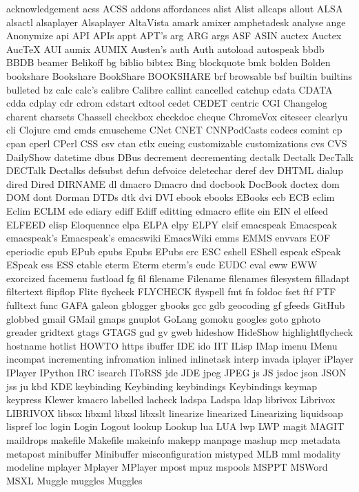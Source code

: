 acknowledgement
acss
ACSS
addons
affordances
alist
Alist
allcaps
allout
ALSA
alsactl
alsaplayer
Alsaplayer
AltaVista
amark
amixer
amphetadesk
analyse
ange
Anonymize
api
API
APIs
appt
APT's
arg
ARG
args
ASF
ASIN
auctex
Auctex
AucTeX
AUI
aumix
AUMIX
Austen's
auth
Auth
autoload
autospeak
bbdb
BBDB
beamer
Belikoff
bg
biblio
bibtex
Bing
blockquote
bmk
bolden
Bolden
bookshare
Bookshare
BookShare
BOOKSHARE
brf
browsable
bsf
builtin
builtins
bulleted
bz
calc
calc's
calibre
Calibre
callint
cancelled
catchup
cdata
CDATA
cdda
cdplay
cdr
cdrom
cdstart
cdtool
cedet
CEDET
centric
CGI
Changelog
charent
charsets
Chassell
checkbox
checkdoc
cheque
ChromeVox
citeseer
clearlyu
cli
Clojure
cmd
cmds
cmuscheme
CNet
CNET
CNNPodCasts
codecs
comint
cp
cpan
cperl
CPerl
CSS
csv
ctan
ctlx
cueing
customizable
customizations
cvs
CVS
DailyShow
datetime
dbus
DBus
decrement
decrementing
dectalk
Dectalk
DecTalk
DECTalk
Dectalks
defsubst
defun
defvoice
deletechar
deref
dev
DHTML
dialup
dired
Dired
DIRNAME
dl
dmacro
Dmacro
dnd
docbook
DocBook
doctex
dom
DOM
dont
Dorman
DTDs
dtk
dvi
DVI
ebook
ebooks
EBooks
ecb
ECB
eclim
Eclim
ECLIM
ede
ediary
ediff
Ediff
editting
edmacro
eflite
ein
EIN
el
elfeed
ELFEED
elisp
Eloquennce
elpa
ELPA
elpy
ELPY
elsif
emacspeak
Emacspeak
emacspeak's
Emacspeak's
emacswiki
EmacsWiki
emms
EMMS
envvars
EOF
eperiodic
epub
EPub
epubs
Epubs
EPubs
erc
ESC
eshell
EShell
espeak
eSpeak
ESpeak
ess
ESS
etable
eterm
Eterm
eterm's
eudc
EUDC
eval
eww
EWW
exorcized
facemenu
fastload
fg
fil
filename
Filename
filenames
filesystem
filladapt
filtertext
flipflop
Flite
flycheck
FLYCHECK
flyspell
fmt
fn
foldoc
fset
ftf
FTF
fulltext
func
GAFA
galeon
gblogger
gbooks
gcc
gdb
geocoding
gf
gfeeds
GitHub
globbed
gmail
GMail
gmaps
gnuplot
GoLang
gomoku
googles
goto
gphoto
greader
gridtext
gtags
GTAGS
gud
gv
gweb
hideshow
HideShow
highlightflycheck
hostname
hotlist
HOWTO
https
ibuffer
IDE
ido
IIT
ILisp
IMap
imenu
IMenu
incompat
incrementing
infromation
inlined
inlinetask
interp
invada
iplayer
iPlayer
IPlayer
IPython
IRC
isearch
IToRSS
jde
JDE
jpeg
JPEG
js
JS
jsdoc
json
JSON
jss
ju
kbd
KDE
keybinding
Keybinding
keybindings
Keybindings
keymap
keypress
Klewer
kmacro
labelled
lacheck
ladspa
Ladspa
ldap
librivox
Librivox
LIBRIVOX
libsox
libxml
libxsl
libxslt
linearize
linearized
Linearizing
liquidsoap
lispref
loc
login
Login
Logout
lookup
Lookup
lua
LUA
lwp
LWP
magit
MAGIT
maildrops
makefile
Makefile
makeinfo
makepp
manpage
mashup
mcp
metadata
metapost
minibuffer
Minibuffer
misconfiguration
mistyped
MLB
mml
modality
modeline
mplayer
Mplayer
MPlayer
mpost
mpuz
mspools
MSPPT
MSWord
MSXL
Muggle
muggles
Muggles
